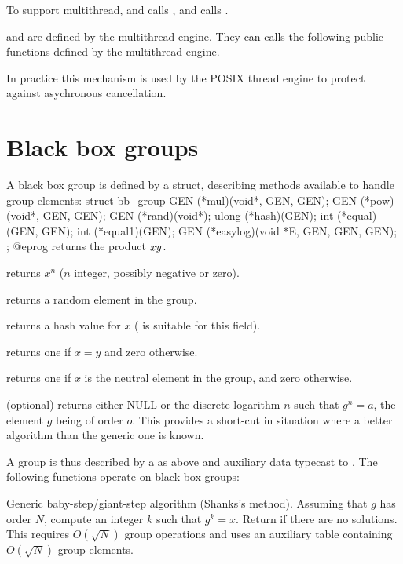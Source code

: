 To support multithread,  and
 calls , and
 calls .

 and  are defined by the
multithread engine. They can calls the following public functions defined by
the multithread engine.



In practice this mechanism is used by the POSIX thread engine to protect against
asychronous cancellation.

\section{Black box groups}

A black box group is defined by a  struct, describing methods
available to handle group elements:
\bprog
    struct bb_group
    {
      GEN (*mul)(void*, GEN, GEN);
      GEN (*pow)(void*, GEN, GEN);
      GEN (*rand)(void*);
      ulong (*hash)(GEN);
      int (*equal)(GEN, GEN);
      int (*equal1)(GEN);
      GEN (*easylog)(void *E, GEN, GEN, GEN);
    };
@eprog
 returns the product $x\*y$.

 returns $x^n$ ($n$ integer, possibly negative or zero).

 returns a random element in the group.

 returns a hash value for $x$ ( is suitable for this field).

 returns one if $x=y$ and zero otherwise.

 returns one if $x$ is the neutral element in the group,
and zero otherwise.

 (optional) returns either NULL or the discrete logarithm
$n$ such that $g^n=a$, the element $g$ being of order $o$. This provides a
short-cut in situation where a better algorithm than the generic one is known.

A group is thus described by a  as above and auxiliary
data typecast to . The following functions operate on black box
groups:

 \break
Generic baby-step/giant-step algorithm (Shanks's method). Assuming
that $g$ has order $N$, compute an integer $k$ such that $g^k = x$.
Return  if there are no solutions. This requires
$O(\sqrt{N})$ group operations and uses an auxiliary table containing
$O(\sqrt{N})$ group elements.

